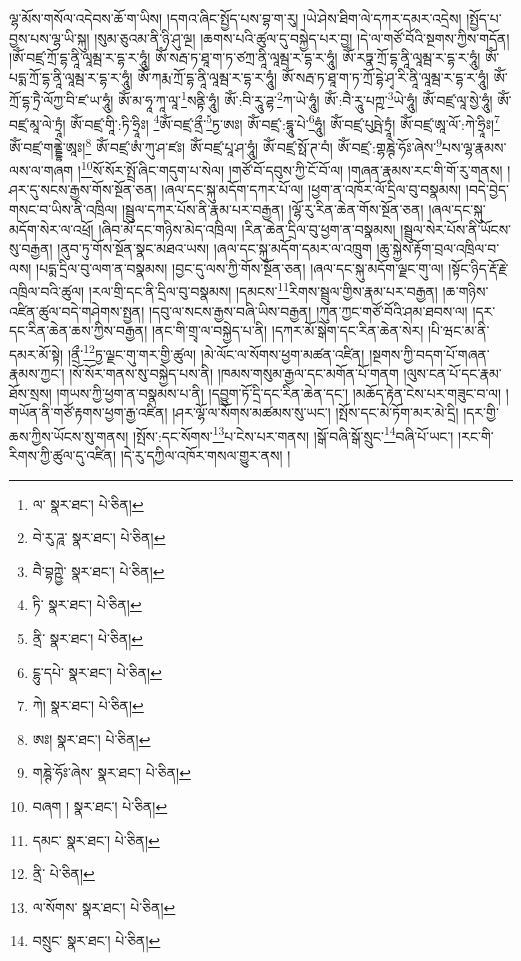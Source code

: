 ལྷ་མོས་གསོལ་འདེབས་ཆོ་ག་ཡིས། །དགའ་ཞིང་སྤྱོད་པས་བྷ་ག་རུ། །ཡེ་ཤེས་ཐིག་ལེ་དཀར་དམར་འདྲེས། །སྤྱོད་པ་བྱས་པས་ལྷ་ཡི་སྐུ། །སུམ་ཅུའམ་ནི་ཉི་ཤུ་ལྔ། །ཆགས་པའི་ཚུལ་དུ་བསྐྱེད་པར་བྱ། །དེ་ལ་གཙོ་བོའི་སྔགས་ཀྱིས་གདོན། །ཨོཾ་བཛྲ་ཀྲོ་དྷ་ནཱི་ལཱམྦ་ར་དྷ་ར་ཧཱུཾ། ཨོཾ་སརྦ་ཏ་ཐཱ་ག་ཏ་ཙཀྲ་ནཱི་ལཱམྦ་ར་དྷ་ར་ཧཱུཾ། ཨོཾ་རཏྣ་ཀྲོ་དྷ་ནཱི་ལཱམྦ་ར་དྷ་ར་ཧཱུཾ། ཨོཾ་པདྨ་ཀྲོ་དྷ་ནཱི་ལཱམྦ་ར་དྷ་ར་ཧཱུཾ། ཨོཾ་ཀརྨ་ཀྲོ་དྷ་ནཱི་ལཱམྦ་ར་དྷ་ར་ཧཱུཾ། ཨོཾ་སརྦ་ཏ་ཐཱ་ག་ཏ་ཀྲོ་དྷེ་ཤྭ་རི་ནཱི་ལཱམྦ་ར་དྷ་ར་ཧཱུཾ། ཨོཾ་ཀྲོ་དྷ་ཏྲཻ་ལོཀྱ་བི་ཛ་ཡ་ཧཱུཾ། ཨོཾ་མ་ཧཱ་ཀཱ་ལཱ་\footnote{ལ་  སྣར་ཐང་།  པེ་ཅིན། }སནྟི་ཧཱུཾ། ཨོཾ་:བི་རཱུ་ཌྷ་\footnote{བེ་རུ་ཌཱ་  སྣར་ཐང་།  པེ་ཅིན། }ཀ་ཡེ་ཧཱུཾ། ཨོཾ་:བཻ་རཱུ་པཀྵ་\footnote{བཻ་བྷཀྵྱེ་  སྣར་ཐང་།  པེ་ཅིན། }ཡེ་ཧཱུཾ། ཨོཾ་བཛྲ་ལཱ་སྱེ་ཧཱུཾ། ཨོཾ་བཛྲ་མཱ་ལེ་ཏྲཱཾ། ཨོཾ་བཛྲ་གཱི་:ཏི་ཧྲཱིཿ། \footnote{ཏི་  སྣར་ཐང་།  པེ་ཅིན། }ཨོཾ་བཛྲ་ནྲྀ་\footnote{ནྲི་  སྣར་ཐང་།  པེ་ཅིན། }ཏྱ་ཨཿ། ཨོཾ་བཛྲ་:དྷཱུ་པེ་\footnote{ངྷུ་དཔེ་  སྣར་ཐང་།  པེ་ཅིན། }ཧཱུཾ། ཨོཾ་བཛྲ་པུཥྤེ་ཏྲཱཾ། ཨོཾ་བཛྲ་ཨཱ་ལོ་:ཀེ་ཧྲཱིཿ།\footnote{ཀེ།  སྣར་ཐང་།  པེ་ཅིན། } ཨོཾ་བཛྲ་གནྡྷེ་ཨཱཿ།\footnote{ཨཿ།  སྣར་ཐང་།  པེ་ཅིན། } ཨོཾ་བཛྲ་ཨཾ་ཀུ་ཤ་ཛཿ། ཨོཾ་བཛྲ་པཱ་ཤ་ཧཱུཾ། ཨོཾ་བཛྲ་སྥོ་ཊ་བཾ། ཨོཾ་བཛྲ་:གྷཎྚེ་ཧོཿ་ཞེས་\footnote{གཎྚེ་ཧོཿ་ཞེས་  སྣར་ཐང་།  པེ་ཅིན། }པས་ལྷ་རྣམས་ལས་ལ་གཞག །\footnote{བཞག །  སྣར་ཐང་།  པེ་ཅིན། }སོ་སོར་སྤྲོ་ཞིང་གདུག་པ་སེལ། །གཙོ་བོ་དབུས་ཀྱི་ངོ་བོ་ལ། །གཞན་རྣམས་རང་གི་གོ་རུ་གནས། །ཤར་དུ་སངས་རྒྱས་གོས་སྔོན་ཅན། །ཞལ་དང་སྐུ་མདོག་དཀར་པོ་ལ། །ཕྱག་ན་འཁོར་ལོ་དྲིལ་བུ་བསྣམས། །བདེ་བྱེད་གསང་བ་ཡིས་ནི་འཁྲིལ། །སྦྲུལ་དཀར་པོས་ནི་རྣམ་པར་བརྒྱན། །ལྷོ་རུ་རིན་ཆེན་གོས་སྔོན་ཅན། །ཞལ་དང་སྐུ་མདོག་སེར་ལ་འཕྲོ། །ཞིབ་མོ་དང་གཉིས་མེད་འཁྲིལ། །རིན་ཆེན་དྲིལ་བུ་ཕྱག་ན་བསྣམས། །སྦྲུལ་སེར་པོས་ནི་ཡོངས་སུ་བརྒྱན། །ནུབ་ཏུ་གོས་སྔོན་སྣང་མཐའ་ཡས། །ཞལ་དང་སྐུ་མདོག་དམར་ལ་འཁྲུག །ཆུ་སྐྱེས་རྟོག་བྲལ་འཁྲིལ་བ་ལས། །པདྨ་དྲིལ་བུ་ལག་ན་བསྣམས། །བྱང་དུ་ལས་ཀྱི་གོས་སྔོན་ཅན། །ཞལ་དང་སྐུ་མདོག་ལྗང་གུ་ལ། །སྟོང་ཉིད་རྡོ་རྗེ་འཁྲིལ་བའི་ཚུལ། །རལ་གྲི་དང་ནི་དྲིལ་བུ་བསྣམས། །དམངས་\footnote{དམང་  སྣར་ཐང་།  པེ་ཅིན། }རིགས་སྦྲུལ་གྱིས་རྣམ་པར་བརྒྱན། །ཆ་གཉིས་འཛིན་ཚུལ་བདེ་གཤེགས་སྤྱན། །དབུ་ལ་སངས་རྒྱས་བཞི་ཡིས་བརྒྱན། །ཀུན་ཀྱང་གཙོ་བོའི་ཤམ་ཐབས་ལ། །དར་དང་རིན་ཆེན་ཆས་ཀྱིས་བརྒྱན། །ནང་གི་གྲྭ་ལ་བསྐྱེད་པ་ནི། །དཀར་མོ་སྒེག་དང་རིན་ཆེན་སེར། །པི་ཝང་མ་ནི་དམར་མོ་སྟེ། །ནྲྀ་\footnote{ནྲི་  པེ་ཅིན། }ཏྱ་ལྗང་གུ་གར་གྱི་ཚུལ། །མེ་ལོང་ལ་སོགས་ཕྱག་མཚན་འཛིན། །སྔགས་ཀྱི་བདག་པོ་གཞན་རྣམས་ཀྱང་། །སོ་སོར་གནས་སུ་བསྐྱེད་པས་ནི། །ཁམས་གསུམ་རྒྱལ་དང་མགོན་པོ་གནག །ལུས་ངན་པོ་དང་རྣམ་ཐོས་སྲས། །གཡས་ཀྱི་ཕྱག་ན་བསྣམས་པ་ནི། །དབྱུག་ཏོ་དྲི་དང་རིན་ཆེན་དང་། །མཆོད་རྟེན་ངེས་པར་གཟུང་བ་ལ། །གཡོན་ནི་གཙོ་རྟགས་ཕྱག་རྒྱ་འཛིན། །ཤར་ལྷོ་ལ་སོགས་མཚམས་སུ་ཡང་། །སྤོས་དང་མེ་ཏོག་མར་མེ་དྲི། །དར་གྱི་ཆས་ཀྱིས་ཡོངས་སུ་གནས། །སྤོས་:དང་སོགས་\footnote{ལ་སོགས་  སྣར་ཐང་།  པེ་ཅིན། }པ་ངེས་པར་གནས། །སྒོ་བཞི་སྒོ་སྲུང་\footnote{བསྲུང་  སྣར་ཐང་།  པེ་ཅིན། }བཞི་པོ་ཡང་། །རང་གི་རིགས་ཀྱི་ཚུལ་དུ་འཛིན། །དེ་རུ་དཀྱིལ་འཁོར་གསལ་གྱུར་ནས། །
